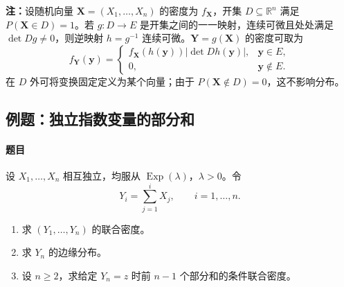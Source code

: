 \textbf{注：}\quad 设随机向量 $\boldsymbol X=(X_1,\ldots,X_n)$ 的密度为 $f_{\boldsymbol X}$，开集 $D\subseteq\mathbb R^n$ 满足 $P(\boldsymbol X\in D)=1$。若 $g:D\to E$ 是开集之间的一一映射，连续可微且处处满足 $\det Dg\ne0$，则逆映射 $h=g^{-1}$ 连续可微。$\boldsymbol Y=g(\boldsymbol X)$ 的密度可取为
\[
f_{\boldsymbol Y}(\boldsymbol y)=
\begin{cases}
f_{\boldsymbol X}(h(\boldsymbol y))|\det Dh(\boldsymbol y)|,
&\boldsymbol y\in E,\\
0,&\boldsymbol y\notin E.
\end{cases}
\]
在 $D$ 外可将变换固定定义为某个向量；由于 $P(\boldsymbol X\notin D)=0$，这不影响分布。

\subsection{例题：独立指数变量的部分和}\label{note:c3:e21}
\paragraph{题目}
设 $X_1,\ldots,X_n$ 相互独立，均服从 $\operatorname{Exp}(\lambda)$，$\lambda>0$。令
\[
Y_i=\sum_{j=1}^{i}X_j,\qquad i=1,\ldots,n.
\]
\begin{enumerate}
\item 求 $(Y_1,\ldots,Y_n)$ 的联合密度。

\item 求 $Y_n$ 的边缘分布。

\item 设 $n\geq2$，求给定 $Y_n=z$ 时前 $n-1$ 个部分和的条件联合密度。
\end{enumerate}

